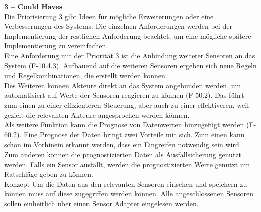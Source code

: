 \textbf{3 – Could Haves}\\
Die Priorisierung 3 gibt Ideen für mögliche Erweiterungen oder eine Verbesserungen des Systems. Die einzelnen Anforderungen werden bei der Implementierung der restlichen Anforderung beachtet, um eine mögliche spätere Implementierung zu vereinfachen.\\
Eine Anforderung mit der Priorität 3 ist die Anbindung weiterer Sensoren an das System (F-10.4.3). Aufbauend auf die weiteren Sensoren ergeben sich neue Regeln und Regelkombinationen, die erstellt werden können.\\
Des Weiteren können Akteure direkt an das System angebunden werden, um automatisiert auf Werte der Sensoren reagieren zu können (F-50.2). Das führt zum einen zu einer effizienteren Steuerung, aber auch zu einer effektiveren, weil gezielt die relevanten Akteure angesprochen werden können.\\
Als weitere Funktion kann die Prognose von Datenwerten hinzugefügt werden (F-60.2). Eine Prognose der Daten bringt zwei Vorteile mit sich. Zum einen kann schon im Vorhinein erkannt werden, dass ein Eingreifen notwendig sein wird. Zum anderen können die prognostizierten Daten als Ausfallsicherung genutzt werden. Falls ein Sensor ausfällt, werden die prognostizierten Werte genutzt um Ratschläge geben zu können.\\
Konzept
Um die Daten aus den relevanten Sensoren einsehen und speichern zu können muss auf diese zugegriffen werden können. Alle angeschlossenen Sensoren sollen einheitlich über einen Sensor Adapter eingelesen werden.

